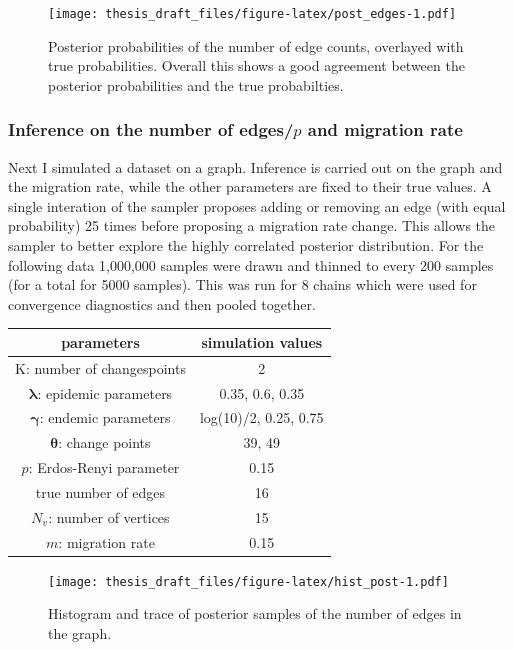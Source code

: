 \documentclass[11pt,a4paper]{article}
\begin{document}
\begin{figure}
\centering
\texttt{[image: thesis\_draft\_files/figure-latex/post\_edges-1.pdf]}
\caption{\label{fig:binom_hist} Posterior probabilities of the number of
edge counts, overlayed with true probabilities. Overall this shows a
good agreement between the posterior probabilities and the true
probabilties.}
\end{figure}

\hypertarget{inference-on-the-number-of-edgesp-and-migration-rate}{%
\subsubsection{\texorpdfstring{Inference on the number of edges/\(p\)
and migration
rate}{Inference on the number of edges/p and migration rate}}\label{inference-on-the-number-of-edgesp-and-migration-rate}}

Next I simulated a dataset on a graph. Inference is carried out on the
graph and the migration rate, while the other parameters are fixed to
their true values. A single interation of the sampler proposes adding or
removing an edge (with equal probability) 25 times before proposing a
migration rate change. This allows the sampler to better explore the
highly correlated posterior distribution. For the following data
1,000,000 samples were drawn and thinned to every 200 samples (for a
total for 5000 samples). This was run for 8 chains which were used for
convergence diagnostics and then pooled together. \pagebreak

\begin{longtable}[]{@{}cc@{}}
\toprule
parameters & simulation values\tabularnewline
\midrule
\endhead
K: number of changespoints & 2\tabularnewline
\(\boldsymbol{\lambda}\): epidemic parameters & 0.35, 0.6,
0.35\tabularnewline
\(\boldsymbol{\gamma}\): endemic parameters & log(10)/2, 0.25,
0.75\tabularnewline
\(\boldsymbol{\theta}\): change points & 39, 49\tabularnewline
\(p\): Erdos-Renyi parameter & 0.15\tabularnewline
true number of edges & 16\tabularnewline
\(N_v\): number of vertices & 15\tabularnewline
\(m\): migration rate & 0.15\tabularnewline
\bottomrule
\end{longtable}

\begin{figure}
\centering
\texttt{[image: thesis\_draft\_files/figure-latex/hist\_post-1.pdf]}
\caption{\label{fig:hist_edges} Histogram and trace of posterior samples
of the number of edges in the graph.}
\end{figure}
\end{document}
